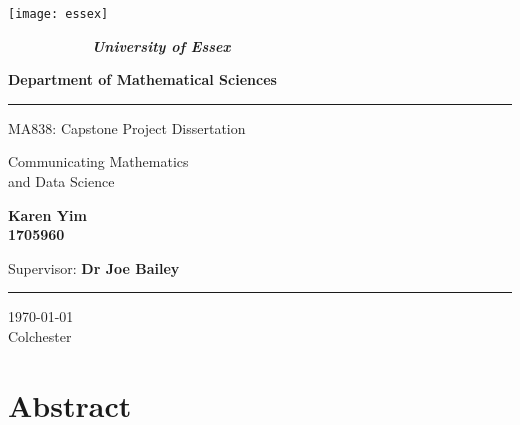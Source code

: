 \documentclass[12pt, a4paper,oneside]{book}
\numberwithin{equation}{section}
\begin{document}
\thispagestyle{empty}

\begin{minipage}{0.2\textwidth}
\centerline{\texttt{[image: essex]} }
\end{minipage}
\begin{minipage}{0.8\textwidth}

$ \qquad \qquad \qquad ${\LARGE \bf \sl University of Essex}

{\LARGE \bf Department of Mathematical Sciences}

\end{minipage}

\begin{center}

\noindent\textcolor{myred}{\rule{\linewidth}{4.8pt}}

\vspace{1cm}

{\LARGE \sc MA838: Capstone  Project Dissertation}

\vspace{1.5cm}

{\Huge{\color{myblue} Communicating Mathematics \\ and Data Science}}

\vspace{1.5cm}


{\Large \bf Karen Yim \\ 1705960}

\vspace{1.5cm}

\vspace{3cm}

\vspace{1.5cm}

{\Large {Supervisor:} {\color{mygreen} \bf  Dr Joe Bailey}}

\vspace{.25cm}

\noindent\textcolor{myred}{\rule{\linewidth}{4.8pt}}

\vspace{1cm}
{\Large \today }\\[4pt]
{\Large Colchester}

\end{center}

\newpage

\section*{Abstract}
\end{document}
